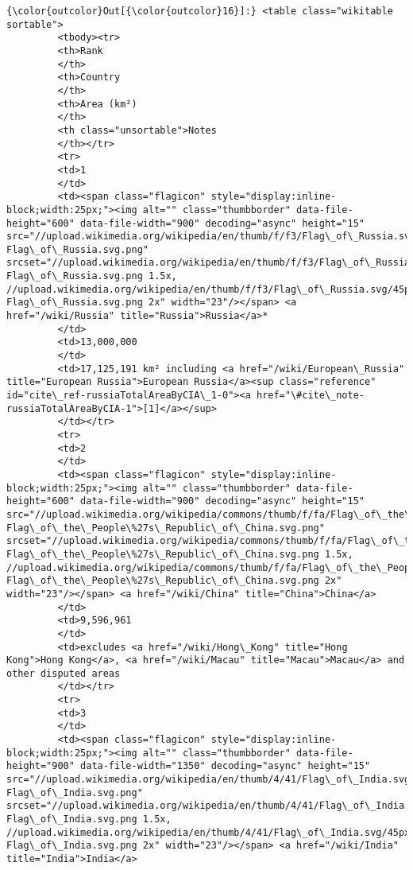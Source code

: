 \documentclass[11pt]{article}
\begin{document}
\begin{Verbatim}[commandchars=\\\{\}]
{\color{outcolor}Out[{\color{outcolor}16}]:} <table class="wikitable sortable">
         <tbody><tr>
         <th>Rank
         </th>
         <th>Country
         </th>
         <th>Area (km²)
         </th>
         <th class="unsortable">Notes
         </th></tr>
         <tr>
         <td>1
         </td>
         <td><span class="flagicon" style="display:inline-block;width:25px;"><img alt="" class="thumbborder" data-file-height="600" data-file-width="900" decoding="async" height="15" src="//upload.wikimedia.org/wikipedia/en/thumb/f/f3/Flag\_of\_Russia.svg/23px-Flag\_of\_Russia.svg.png" srcset="//upload.wikimedia.org/wikipedia/en/thumb/f/f3/Flag\_of\_Russia.svg/35px-Flag\_of\_Russia.svg.png 1.5x, //upload.wikimedia.org/wikipedia/en/thumb/f/f3/Flag\_of\_Russia.svg/45px-Flag\_of\_Russia.svg.png 2x" width="23"/></span> <a href="/wiki/Russia" title="Russia">Russia</a>*
         </td>
         <td>13,000,000
         </td>
         <td>17,125,191 km² including <a href="/wiki/European\_Russia" title="European Russia">European Russia</a><sup class="reference" id="cite\_ref-russiaTotalAreaByCIA\_1-0"><a href="\#cite\_note-russiaTotalAreaByCIA-1">[1]</a></sup>
         </td></tr>
         <tr>
         <td>2
         </td>
         <td><span class="flagicon" style="display:inline-block;width:25px;"><img alt="" class="thumbborder" data-file-height="600" data-file-width="900" decoding="async" height="15" src="//upload.wikimedia.org/wikipedia/commons/thumb/f/fa/Flag\_of\_the\_People\%27s\_Republic\_of\_China.svg/23px-Flag\_of\_the\_People\%27s\_Republic\_of\_China.svg.png" srcset="//upload.wikimedia.org/wikipedia/commons/thumb/f/fa/Flag\_of\_the\_People\%27s\_Republic\_of\_China.svg/35px-Flag\_of\_the\_People\%27s\_Republic\_of\_China.svg.png 1.5x, //upload.wikimedia.org/wikipedia/commons/thumb/f/fa/Flag\_of\_the\_People\%27s\_Republic\_of\_China.svg/45px-Flag\_of\_the\_People\%27s\_Republic\_of\_China.svg.png 2x" width="23"/></span> <a href="/wiki/China" title="China">China</a>
         </td>
         <td>9,596,961
         </td>
         <td>excludes <a href="/wiki/Hong\_Kong" title="Hong Kong">Hong Kong</a>, <a href="/wiki/Macau" title="Macau">Macau</a> and other disputed areas
         </td></tr>
         <tr>
         <td>3
         </td>
         <td><span class="flagicon" style="display:inline-block;width:25px;"><img alt="" class="thumbborder" data-file-height="900" data-file-width="1350" decoding="async" height="15" src="//upload.wikimedia.org/wikipedia/en/thumb/4/41/Flag\_of\_India.svg/23px-Flag\_of\_India.svg.png" srcset="//upload.wikimedia.org/wikipedia/en/thumb/4/41/Flag\_of\_India.svg/35px-Flag\_of\_India.svg.png 1.5x, //upload.wikimedia.org/wikipedia/en/thumb/4/41/Flag\_of\_India.svg/45px-Flag\_of\_India.svg.png 2x" width="23"/></span> <a href="/wiki/India" title="India">India</a>

\end{Verbatim}
\end{document}
